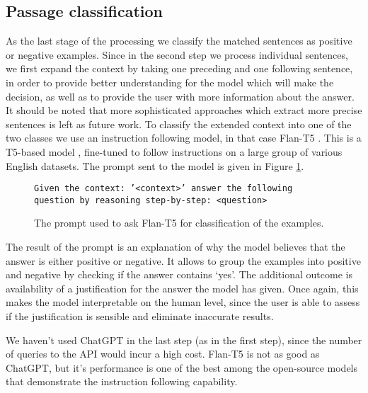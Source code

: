\subsection{Passage classification}

As the last stage of the processing we classify the matched sentences as positive or negative examples. Since in the second step
we process individual sentences, we first expand the context by taking one preceding and one following sentence, in 
order to provide better understanding for the model which will make the decision, as well as to provide the user with more information about the answer. It should be noted that more sophisticated approaches which extract more precise sentences is left as future work.
To classify the extended 
context into one of the two classes we use an instruction following model, in that case Flan-T5 \cite{chung2022scaling}. 
This is a T5-based model \cite{raffel2020exploring}, fine-tuned to follow instructions on a large group of various
English datasets. The prompt sent to the model is given in Figure \ref{fig:flan-instruction}.

\begin{figure}[htbp]
  \texttt{Given the context: '<context>' answer the following question by reasoning step-by-step: <question>} 
  \caption{The prompt used to ask Flan-T5 for classification of the examples.}
  \label{fig:flan-instruction}
\end{figure}

The result of the prompt is an explanation of why the model believes that the answer is either positive or negative.
It allows to group the examples into positive and negative by checking if the answer contains `yes'. The additional
outcome is availability of a justification for the answer the model has given. Once again, this makes the model
interpretable on the human level, since the user is able to assess if the justification is sensible and eliminate inaccurate results. 

We haven't used ChatGPT in the last step (as in the first step), since the number of queries to the API would incur
a high cost. Flan-T5 is not as good as ChatGPT, but it's performance is one of the best \cite{chia2023instructeval} 
among the open-source models that demonstrate the instruction following capability.